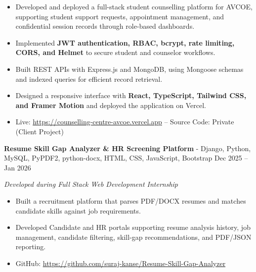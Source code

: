 \documentclass[a4paper,10pt]{article}
\begin{document}
\begin{itemize}[leftmargin=*,itemsep=0pt]
\item Developed and deployed a full-stack student counselling platform for AVCOE, supporting student support requests, appointment management, and confidential session records through role-based dashboards.
\vspace{-5pt}
\item Implemented \textbf{JWT authentication, RBAC, bcrypt, rate limiting, CORS, and Helmet} to secure student and counselor workflows.
\vspace{-5pt}
\item Built REST APIs with Express.js and MongoDB, using Mongoose schemas and indexed queries for efficient record retrieval.
\vspace{-5pt}
\item Designed a responsive interface with \textbf{React, TypeScript, Tailwind CSS, and Framer Motion} and deployed the application on Vercel.
\vspace{-5pt}
\item Live: \url{https://counselling-centre-avcoe.vercel.app} -- Source Code: Private (Client Project)
\end{itemize}

\vspace{-4pt}

\textbf{Resume Skill Gap Analyzer \& HR Screening Platform} - {\footnotesize{{Django, Python, MySQL, PyPDF2, python-docx, HTML, CSS, JavaScript, Bootstrap}}}
\hfill Dec 2025 -- Jan 2026

\textit{Developed during Full Stack Web Development Internship}
\vspace{-10pt}

\begin{itemize}[leftmargin=*,itemsep=0pt]
\item Built a recruitment platform that parses PDF/DOCX resumes and matches candidate skills against job requirements.
\item Developed Candidate and HR portals supporting resume analysis history, job management, candidate filtering, skill-gap recommendations, and PDF/JSON reporting.
\vspace{-5pt}
\item GitHub: \url{https://github.com/suraj-kanse/Resume-Skill-Gap-Analyzer}
\end{itemize}

\end{document}
